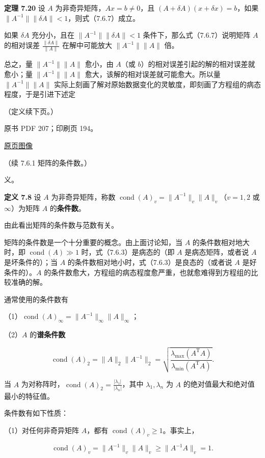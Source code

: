 \documentclass[
  10pt,
  fontset=fandol]{ctexart}
\begin{document}
\textbf{定理 7.20} 设 \(A\) 为非奇异矩阵，\(Ax=b\neq0\)，且
\((A+\delta A)(x+\delta x)=b\)，如果
\(\|A^{-1}\|\|\delta A\|<1\)，则式（7.6.7）成立。

如果 \(\delta A\) 充分小，且在 \(\|A^{-1}\|\|\delta A\|<1\)
条件下，那么式（7.6.7）说明矩阵 \(A\) 的相对误差
\(\frac{\|\delta A\|}{\|A\|}\) 在解中可能放大 \(\|A^{-1}\|\|A\|\) 倍。

总之，量 \(\|A^{-1}\|\|A\|\) 愈小，由 \(A\)（或
\(b\)）的相对误差引起的解的相对误差就愈小；量 \(\|A^{-1}\|\|A\|\)
愈大，该解的相对误差就可能愈大。所以量 \(\|A^{-1}\|\|A\|\)
实际上刻画了解对原始数据变化的灵敏度，即刻画了方程组的病态程度，于是引进下述定

（定义续下页。）

\clearpage

原书 PDF 207；印刷页 194。

\href{../../../source-images/pdf-207.jpeg}{原页图像}

（续 7.6.1 矩阵的条件数。）

义。

\textbf{定义 7.8} 设 \(A\) 为非奇异矩阵，称数
\(\operatorname{cond}(A)_v=\|A^{-1}\|_v\|A\|_v\)（\(v=1,2\) 或
\(\infty\)）为矩阵 \(A\) 的\textbf{条件数}。

由此看出矩阵的条件数与范数有关。

矩阵的条件数是一个十分重要的概念。由上面讨论知，当 \(A\)
的条件数相对地大时，即 \(\operatorname{cond}(A)\gg1\)
时，式（7.6.3）是病态的（即 \(A\) 是病态矩阵，或者说 \(A\)
是坏条件的）；当 \(A\) 的条件数相对地小时，式（7.6.3）是良态的（或者说
\(A\) 是好条件的）。\(A\)
的条件数愈大，方程组的病态程度愈严重，也就愈难得到方程组的比较准确的解。

通常使用的条件数有

（1）\(\operatorname{cond}(A)_\infty=\|A^{-1}\|_\infty\|A\|_\infty\)；

（2）\(A\) 的\textbf{谱条件数}

\[
\operatorname{cond}(A)_2=\|A\|_2\|A^{-1}\|_2
=\sqrt{\frac{\lambda_{\max}(A^{\mathrm T}A)}{\lambda_{\min}(A^{\mathrm T}A)}}.
\]

当 \(A\)
为对称阵时，\(\operatorname{cond}(A)_2=\frac{|\lambda_1|}{|\lambda_n|}\)，其中
\(\lambda_1,\lambda_n\) 为 \(A\) 的绝对值最大和绝对值最小的特征值。

条件数有如下性质：

（1）对任何非奇异矩阵 \(A\)，都有
\(\operatorname{cond}(A)_v\geqslant1\)。事实上，

\[
\operatorname{cond}(A)_v=\|A^{-1}\|_v\|A\|_v\geqslant\|A^{-1}A\|_v=1.
\]
\end{document}
